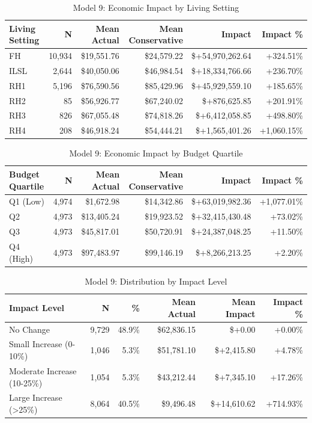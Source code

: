 \begin{table}[htbp]
\centering
\small
\caption{Model 9: Economic Impact by Living Setting}
\label{tab:model9_impact_living}
\begin{tabular}{lrrrrr}
\toprule
\textbf{Living Setting} & \textbf{N} & \textbf{Mean Actual} & \textbf{Mean Conservative} & \textbf{Impact} & \textbf{Impact \%} \\
\midrule
FH & 10,934 & \$19,551.76 & \$24,579.22 & \$+54,970,262.64 & +324.51\% \\
ILSL & 2,644 & \$40,050.06 & \$46,984.54 & \$+18,334,766.66 & +236.70\% \\
RH1 & 5,196 & \$76,590.56 & \$85,429.96 & \$+45,929,559.10 & +185.65\% \\
RH2 & 85 & \$56,926.77 & \$67,240.02 & \$+876,625.85 & +201.91\% \\
RH3 & 826 & \$67,055.48 & \$74,818.26 & \$+6,412,058.85 & +498.80\% \\
RH4 & 208 & \$46,918.24 & \$54,444.21 & \$+1,565,401.26 & +1,060.15\% \\
\bottomrule
\end{tabular}
\end{table}

\begin{table}[htbp]
\centering
\small
\caption{Model 9: Economic Impact by Budget Quartile}
\label{tab:model9_impact_quartile}
\begin{tabular}{lrrrrr}
\toprule
\textbf{Budget Quartile} & \textbf{N} & \textbf{Mean Actual} & \textbf{Mean Conservative} & \textbf{Impact} & \textbf{Impact \%} \\
\midrule
Q1 (Low) & 4,974 & \$1,672.98 & \$14,342.86 & \$+63,019,982.36 & +1,077.01\% \\
Q2 & 4,973 & \$13,405.24 & \$19,923.52 & \$+32,415,430.48 & +73.02\% \\
Q3 & 4,973 & \$45,817.01 & \$50,720.91 & \$+24,387,048.25 & +11.50\% \\
Q4 (High) & 4,973 & \$97,483.97 & \$99,146.19 & \$+8,266,213.25 & +2.20\% \\
\bottomrule
\end{tabular}
\end{table}

\begin{table}[htbp]
\centering
\small
\caption{Model 9: Distribution by Impact Level}
\label{tab:model9_impact_distribution}
\begin{tabular}{lrrrrr}
\toprule
\textbf{Impact Level} & \textbf{N} & \textbf{\%} & \textbf{Mean Actual} & \textbf{Mean Impact} & \textbf{Impact \%} \\
\midrule
No Change & 9,729 & 48.9\% & \$62,836.15 & \$+0.00 & +0.00\% \\
Small Increase (0-10\%) & 1,046 & 5.3\% & \$51,781.10 & \$+2,415.80 & +4.78\% \\
Moderate Increase (10-25\%) & 1,054 & 5.3\% & \$43,212.44 & \$+7,345.10 & +17.26\% \\
Large Increase (>25\%) & 8,064 & 40.5\% & \$9,496.48 & \$+14,610.62 & +714.93\% \\
\bottomrule
\end{tabular}
\end{table}

